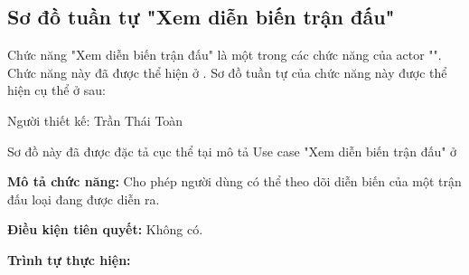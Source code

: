 \subsection{Sơ đồ tuần tự "Xem diễn biến trận đấu"}
\setcounter{figure}{0}

Chức năng "Xem diễn biến trận đấu" là một trong các chức năng của actor "".
Chức năng này đã được thể hiện ở \myref{}.
Sơ đồ tuần tự của chức năng này được thể hiện cụ thể ở \myref{} sau:

Người thiết kế: Trần Thái Toàn

Sơ đồ này đã được đặc tả cục thể tại mô tả Use case
"Xem diễn biến trận đấu" ở 

\noindent
\textbf{Mô tả chức năng:} Cho phép người dùng có thể theo dõi diễn biến của một trận đấu loại đang được diễn ra.

\noindent
\textbf{Điều kiện tiên quyết:} Không có.

\noindent
\textbf{Trình tự thực hiện:}

